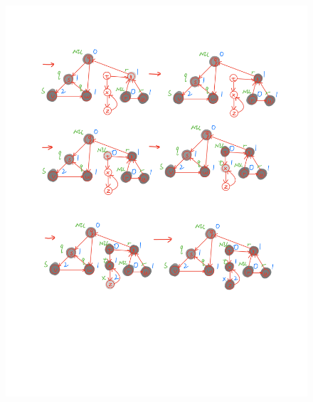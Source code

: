 \documentclass[12pt,a4paper,fontset=none]{ctexart}
\begin{document}
\begin{figure}[H]
    \centering
    \includegraphics[width=1\linewidth]{IMG_0121.PNG}
\end{figure}
\end{document}
